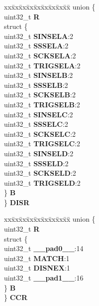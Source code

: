 \begin{DoxyCompactItemize}
\begin{tabbing}
\end{tabbing}\item 
\mbox{\label{structSIU__tag_aee4171bab68a5dd8b76db9fe9c2f37f8}} 
\begin{tabbing}
xx\=xx\=xx\=xx\=xx\=xx\=xx\=xx\=xx\=\kill
union \{\\
\>uint32\_t {\bfseries R}\\
\>struct \{\\
\>\>uint32\_t {\bfseries SINSELA}:2\\
\>\>uint32\_t {\bfseries SSSELA}:2\\
\>\>uint32\_t {\bfseries SCKSELA}:2\\
\>\>uint32\_t {\bfseries TRIGSELA}:2\\
\>\>uint32\_t {\bfseries SINSELB}:2\\
\>\>uint32\_t {\bfseries SSSELB}:2\\
\>\>uint32\_t {\bfseries SCKSELB}:2\\
\>\>uint32\_t {\bfseries TRIGSELB}:2\\
\>\>uint32\_t {\bfseries SINSELC}:2\\
\>\>uint32\_t {\bfseries SSSELC}:2\\
\>\>uint32\_t {\bfseries SCKSELC}:2\\
\>\>uint32\_t {\bfseries TRIGSELC}:2\\
\>\>uint32\_t {\bfseries SINSELD}:2\\
\>\>uint32\_t {\bfseries SSSELD}:2\\
\>\>uint32\_t {\bfseries SCKSELD}:2\\
\>\>uint32\_t {\bfseries TRIGSELD}:2\\
\>\} {\bfseries B}\\
\} {\bfseries DISR}\\

\end{tabbing}\item 
\mbox{\label{structSIU__tag_a9e8a0d967740ec7817297fde55075806}} 
\begin{tabbing}
xx\=xx\=xx\=xx\=xx\=xx\=xx\=xx\=xx\=\kill
union \{\\
\>uint32\_t {\bfseries R}\\
\>struct \{\\
\>\>uint32\_t {\bfseries \_\_pad0\_\_}:14\\
\>\>uint32\_t {\bfseries MATCH}:1\\
\>\>uint32\_t {\bfseries DISNEX}:1\\
\>\>uint32\_t {\bfseries \_\_pad1\_\_}:16\\
\>\} {\bfseries B}\\
\} {\bfseries CCR}\\


\end{tabbing}
\end{DoxyCompactItemize}
